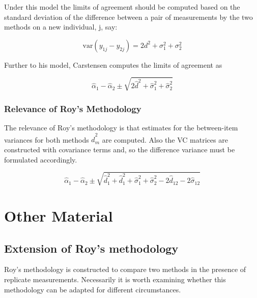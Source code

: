 \documentclass[12pt, a4paper]{report}
\theoremstyle{plain}
\theoremstyle{definition}
\theoremstyle{remark}
\begin{document}
Under this model the limits of agreement should be computed based
on the standard deviation of the difference between a pair of
measurements by the two methods on a new individual, j, say:

\[ \mbox{var}(y_{1j} - y_{2j}) = 2d^2 + \sigma^2_1 + \sigma^2_2  \]

Further to his model, Carstensen computes the limits of agreement
as

\[
\hat{\alpha}_1 - \hat{\alpha}_2 \pm \sqrt{2 \hat{d}^2 + 	\hat{\sigma}^2_1 + \hat{\sigma}^2_2}
\]


\subsection{Relevance of Roy's Methodology}

The relevance of Roy's methodology is that estimates for the between-item variances for both methods $\hat{d}^2_m$ are computed. Also the VC matrices are constructed with covariance
terms and, so the difference variance must be formulated accordingly.


\[
\hat{\alpha}_1 - \hat{\alpha}_2 \pm \sqrt{ \hat{d}^2_1  +
	\hat{d}^2_1 + \hat{\sigma}^2_1 + \hat{\sigma}^2_2 - 2 \hat{d}_{12}
	- 2 \hat{\sigma}_12}
\]








%


\newpage

\chapter{Other Material}
\section{Extension of Roy's methodology}
Roy's methodology is constructed to compare two methods in the presence of replicate measurements. Necessarily it is worth examining whether this methodology can be adapted for different circumstances.
\end{document}
